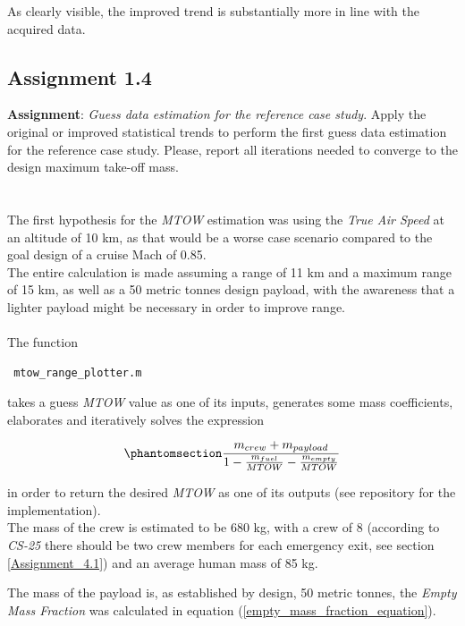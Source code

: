\documentclass{article}
\begin{document}
As clearly visible, the improved trend is substantially more in line with the acquired data.


\clearpage
\subsection{Assignment 1.4\label{Assignments_1.4}}
\textbf{Assignment}: \textit{Guess data estimation for the reference
case study}. Apply the original or improved statistical trends to
perform the first guess data estimation for the reference case
study. Please, report all iterations needed to converge to the
design maximum take-off mass.\\ \\ \\ 

The first hypothesis for the \textit{MTOW} estimation was using the \textit{True Air Speed}
at an altitude of 10 km, as that would be a worse case scenario compared to the goal design
of a cruise Mach of 0.85. \\ 
The entire calculation is made assuming a range of 11 km and a maximum range of 15 km, as well as
a 50 metric tonnes design payload, with the awareness that a lighter payload might be necessary
in order to improve range.\\ \\
The function \begin{verbatim} mtow_range_plotter.m \end{verbatim} takes a guess \textit{MTOW} value as one of its inputs, generates some mass coefficients,
elaborates and iteratively solves the expression

\begin{equation}
    \phantomsection
    \label{mtow_esitmate_equation}
    \frac{m_{crew} + m_{payload}}{1 - \frac{m_{fuel}}{MTOW} - \frac{m_{empty}}{MTOW}} 
\end{equation}

in order to return the desired \textit{MTOW} as one of its outputs (see repository \autocite{Airbus_replacement_repo} for the implementation).\\ 

The mass of the crew is estimated to be 680 kg, with a crew of 8 (according to \textit{CS-25} \autocite{EASA_CS25} there should be two crew members for each emergency exit, see section \ref{Assignment_4.1}) and an average human mass of 85 kg.


The mass of the payload is, as established by design, 50 metric tonnes, the \textit{Empty Mass Fraction} was calculated in 
equation (\ref{empty_mass_fraction_equation}). 
\end{document}
